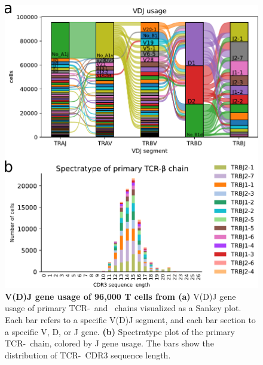 \documentclass{article}
\begin{document}
\newpage
\begin{figure}[!ht]
  \centering
  \includegraphics[width=7in]{../figures/gene_usage.pdf}
  \caption{\textbf{V(D)J gene usage of 96,000 T cells from \textcite{Wu2020-vp}} \textbf{(a)} V(D)J gene usage of primary TCR-\textalpha\ and \textbeta\ chains visualized as a Sankey plot. Each bar refers to a specific V(D)J segment, and each bar section to a specific V, D, or J gene. \textbf{(b)} Spectratype plot of the primary TCR-\textbeta\ chain, colored by J gene usage. The bars show the distribution of TCR-\textbeta\ CDR3 sequence length.}
\end{figure}
\end{document}
